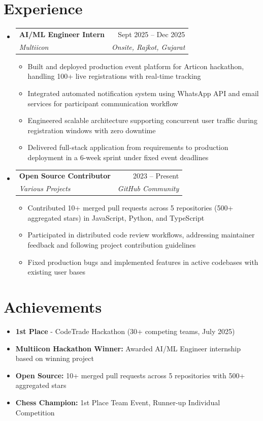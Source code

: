\documentclass[11pt,a4paper]{article}
\makeatletter
\newcommand{\resumeSubheading}[4]{
  \vspace{-1pt}\item
    \begin{tabular*}{0.97\textwidth}[t]{l@{\extracolsep{\fill}}r}
      \textbf{#1} & #2 \\
      \textit{#3} & \textit{#4} \\
    \end{tabular*}\vspace{-3pt}
}
\newcommand{\resumeItem}[1]{
  \item\small{#1 \vspace{-1pt}}
}
\makeatother
\begin{document}
\section{Experience}
\begin{itemize}[leftmargin=*]
\resumeSubheading
{AI/ML Engineer Intern}{Sept 2025 -- Dec 2025}
{Multiicon}{Onsite, Rajkot, Gujarat}
\begin{itemize}[leftmargin=*]
\resumeItem{Built and deployed production event platform for Articon hackathon, handling 100+ live registrations with real-time tracking}
\resumeItem{Integrated automated notification system using WhatsApp API and email services for participant communication workflow}
\resumeItem{Engineered scalable architecture supporting concurrent user traffic during registration windows with zero downtime}
\resumeItem{Delivered full-stack application from requirements to production deployment in a 6-week sprint under fixed event deadlines}
\end{itemize}

\resumeSubheading
{Open Source Contributor}{2023 -- Present}
{Various Projects}{GitHub Community}
\begin{itemize}[leftmargin=*]
\resumeItem{Contributed 10+ merged pull requests across 5 repositories (500+ aggregated stars) in JavaScript, Python, and TypeScript}
\resumeItem{Participated in distributed code review workflows, addressing maintainer feedback and following project contribution guidelines}
\resumeItem{Fixed production bugs and implemented features in active codebases with existing user bases}
\end{itemize}
\end{itemize}

\section{Achievements}
\begin{itemize}[leftmargin=*]
\resumeItem{\textbf{1st Place} - CodeTrade Hackathon (30+ competing teams, July 2025)}
\resumeItem{\textbf{Multiicon Hackathon Winner:} Awarded AI/ML Engineer internship based on winning project}
\resumeItem{\textbf{Open Source:} 10+ merged pull requests across 5 repositories with 500+ aggregated stars}
\resumeItem{\textbf{Chess Champion:} 1st Place Team Event, Runner-up Individual Competition}
\end{itemize}

\end{document}
